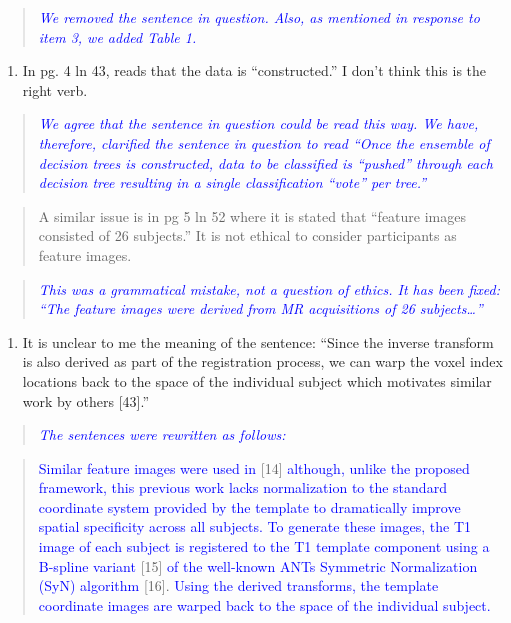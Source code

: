 \documentclass[12pt,]{article}
\providecommand{\tightlist}{%
  \setlength{\itemsep}{0pt}\setlength{\parskip}{0pt}}
\begin{document}
\begin{quote}
\emph{\textcolor{blue}{We removed the sentence in question.  Also, as mentioned in
response to item 3, we added Table 1.}}
\end{quote}

\begin{enumerate}
\def\labelenumi{\arabic{enumi}.}
\setcounter{enumi}{9}
\tightlist
\item
  In pg. 4 ln 43, reads that the data is ``constructed.'' I don't think
  this is the right verb.
\end{enumerate}

\begin{quote}
\emph{\textcolor{blue}{We agree that the sentence in question could be read this way.
We have, therefore, clarified the sentence in question to read
``Once the ensemble of decision trees is constructed, data to be classified is ``pushed''
through each decision tree resulting in a single classification ``vote'' per tree.''}}
\end{quote}

\begin{quote}
A similar issue is in pg 5 ln 52 where it is stated that ``feature
images consisted of 26 subjects.'' It is not ethical to consider
participants as feature images.
\end{quote}

\begin{quote}
\emph{\textcolor{blue}{This was a grammatical mistake, not a question of
ethics.  It has been fixed: ``The feature images
were derived from MR acquisitions of 26 subjects\ldots''}}
\end{quote}

\begin{enumerate}
\def\labelenumi{\arabic{enumi}.}
\setcounter{enumi}{10}
\tightlist
\item
  It is unclear to me the meaning of the sentence: ``Since the inverse
  transform is also derived as part of the registration process, we can
  warp the voxel index locations back to the space of the individual
  subject which motivates similar work by others {[}43{]}.''
\end{enumerate}

\begin{quote}
\emph{\textcolor{blue}{The sentences were rewritten as follows:}}
\end{quote}

\begin{quote}
\textcolor{blue}{Similar feature images were used in} {[}14{]}
\textcolor{blue}{although, unlike the proposed framework, this previous work lacks
normalization to the standard
coordinate system provided by the template to dramatically improve spatial specificity
across all subjects.  To generate these images, the T1 image of each subject is
registered to the T1 template component using a B-spline variant}
{[}15{]}
\textcolor{blue}{of the well-known ANTs Symmetric Normalization (SyN) algorithm}
{[}16{]}.
\textcolor{blue}{Using the derived transforms, the template coordinate images are warped back to the space of the individual subject.}
\end{quote}
\end{document}
